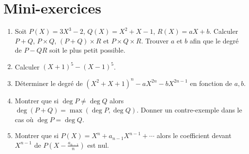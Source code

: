 \section{Mini-exercices}

\begin{frame}

\begin{miniexercice}
\begin{enumerate}
  \item Soit $P(X)=3X^3-2$, $Q(X)=X^2+X-1$, $R(X)=aX+b$.
Calculer $P+Q$, $P\times Q$, $(P+Q)\times R$ et $P\times Q \times R$.
Trouver $a$ et $b$ afin que le degré de $P-QR$ soit le plus petit possible.

  \item Calculer $(X+1)^5-(X-1)^5$.

  \item Déterminer le degré de $(X^2+X+1)^n - aX^{2n}-bX^{2n-1}$ en fonction de $a,b$.

  \item Montrer que si $\deg P \neq \deg Q$ alors $\deg (P+Q)= \max(\deg P,\deg Q)$.
Donner un contre-exemple dans le cas où $\deg P = \deg Q$.

  \item Montrer que si $P(X)=X^n+a_{n-1}X^{n-1}+ \cdots$ alors le coefficient devant $X^{n-1}$ de 
$P(X-\frac{a_{n-1}}{n})$ est nul.
\end{enumerate}
\end{miniexercice}

\end{frame}

